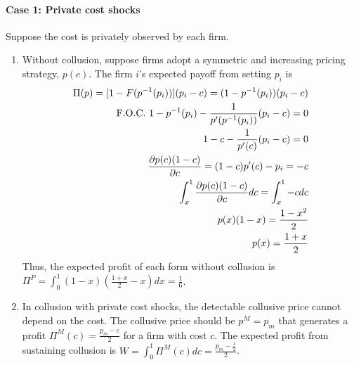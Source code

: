 \documentclass[12pt]{article}
\begin{document}
\paragraph{Case 1: Private cost shocks}
Suppose the cost is privately observed by each firm.
\begin{enumerate}
    \item Without collusion, suppose firms adopt a symmetric and increasing pricing strategy, $p(c)$. The firm $i$'s expected payoff from setting $p_i$ is
    \begin{equation}
        \begin{aligned}
            \Pi(p)=[1-F(p^{-1}(p_i))](p_i-c)=(1-p^{-1}(p_i))(p_i-c)\\
            \textnormal{F.O.C. }1-p^{-1}(p_i)-\frac{1}{p'(p^{-1}(p_i))}(p_i-c)=0\\
            1-c-\frac{1}{p'(c)}(p_i-c)=0\\
            \frac{\partial p(c)(1-c)}{\partial c}=(1-c)p'(c)-p_i=-c\\
            \int_{x}^{1}\frac{\partial p(c)(1-c)}{\partial c}dc=\int_{x}^{1}-cdc\\
            p(x)(1-x)=\frac{1-x^2}{2}\\
            p(x)=\frac{1+x}{2}
        \end{aligned}
        \nonumber
    \end{equation}
    Thus, the expected profit of each form without collusion is $\Pi^P=\int_0^1 (1-x)(\frac{1+x}{2}-x)dx=\frac{1}{6}$.
    \item In collusion with private cost shocks, the detectable collusive price cannot depend on the cost. The collusive price should be $p^M=p_m$ that generates a profit $\Pi^M(c)=\frac{p_m-c}{2}$ for a firm with cost $c$. The expected profit from sustaining collusion is $W=\int_0^1 \Pi^M(c)dc=\frac{p_m-\frac{1}{2}}{2}$.
\end{enumerate}
\end{document}

